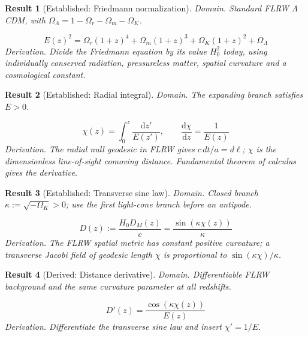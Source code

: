 \documentclass[aps,prd,onecolumn,notitlepage,groupedaddress,11pt]{revtex4-2}
\newtheorem{result}{Result}
\begin{document}
\begin{result}[\textsf{Established}: Friedmann normalization]\label{res:1}
\textit{Domain.} Standard FLRW $\Lambda$CDM, with $\Omega_\Lambda=1-\Omega_r-\Omega_m-\Omega_K$.\par
\begin{equation}\label{eq:1}
E(z)^2=\Omega_r(1+z)^4+\Omega_m(1+z)^3+\Omega_K(1+z)^2+\Omega_\Lambda
\end{equation}
\textit{Derivation.} Divide the Friedmann equation by its value $H_0^2$ today, using individually conserved radiation, pressureless matter, spatial curvature and a cosmological constant.
\end{result}

\begin{result}[\textsf{Established}: Radial integral]\label{res:2}
\textit{Domain.} The expanding branch satisfies $E>0$.\par
\begin{equation}\label{eq:2}
\chi(z)=\int_0^z\frac{\mathrm dz\prime}{E(z\prime)},\qquad\frac{\mathrm d\chi}{\mathrm dz}=\frac1{E(z)}
\end{equation}
\textit{Derivation.} The radial null geodesic in FLRW gives $c\,dt/a=d\ell$; $\chi$ is the dimensionless line-of-sight comoving distance. Fundamental theorem of calculus gives the derivative.
\end{result}

\begin{result}[\textsf{Established}: Transverse sine law]\label{res:3}
\textit{Domain.} Closed branch $\kappa:=\sqrt{-\Omega_K}>0$; use the first light-cone branch before an antipode.\par
\begin{equation}\label{eq:3}
D(z):=\frac{H_0D_M(z)}c=\frac{\sin(\kappa\chi(z))}{\kappa}
\end{equation}
\textit{Derivation.} The FLRW spatial metric has constant positive curvature; a transverse Jacobi field of geodesic length $\chi$ is proportional to $\sin(\kappa\chi)/\kappa$.
\end{result}

\begin{result}[\textsf{Derived}: Distance derivative]\label{res:4}
\textit{Domain.} Differentiable FLRW background and the same curvature parameter at all redshifts.\par
\begin{equation}\label{eq:4}
D\prime(z)=\frac{\cos(\kappa\chi(z))}{E(z)}
\end{equation}
\textit{Derivation.} Differentiate the transverse sine law and insert $\chi\prime=1/E$.
\end{result}
\end{document}
